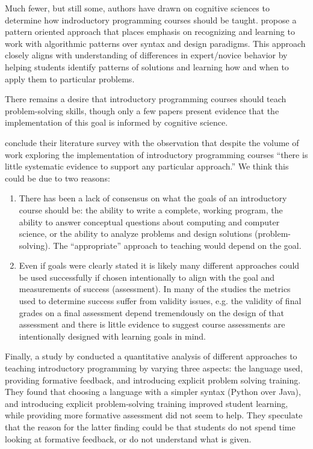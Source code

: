 \documentclass[12pt]{article}
\let\textcite=\autocite
\begin{document}
Much fewer, but still some, authors have drawn on cognitive sciences
to determine how indroductory programming courses should be
taught. \textcite{muller_pattern_2005} propose a pattern oriented
approach that places emphasis on recognizing and learning to work with
algorithmic patterns over syntax and design paradigms. This approach
closely aligns with understanding of differences in expert/novice
behavior by helping students identify patterns of solutions and
learning how and when to apply them to particular problems.

There remains a desire that introductory programming courses should
teach problem-solving skills, though only a few papers present
evidence that the implementation of this goal is informed by cognitive
science\autocite{kramarski_cognitivemetacognitive_1997,reed_incorporating_1998,muller_supporting_2008}.

\citeauthor{pears_survey_2007-1} conclude their
\citeyear{pears_survey_2007-1} literature survey with the observation
that despite the volume of work exploring the implementation of
introductory programming courses “there is little systematic evidence
to support any particular approach.”\autocite{pears_survey_2007-1}
We think this could be due to two reasons:

\begin{enumerate}
\item There has been a lack of consensus on what the goals of an
  introductory course should be: the ability to write a complete,
  working program, the ability to answer conceptual questions about
  computing and computer science, or the ability to analyze problems
  and design solutions (problem-solving). The “appropriate” approach
  to teaching would depend on the goal.

\item Even if goals were clearly stated it is likely many different
  approaches could be used successfully if chosen intentionally to
  align with the goal and measurements of success (assessment). In
  many of the studies the metrics used to determine success suffer
  from validity issues, e.g. the validity of final grades on a final
  assessment depend tremendously on the design of that assessment and
  there is little evidence to suggest course assessments are
  intentionally designed with learning goals in mind.
\end{enumerate}

Finally, a \citeyear{koulouri_teaching_2014} study by
\citeauthor{koulouri_teaching_2014} conducted a quantitative analysis
of different approaches to teaching introductory programming by
varying three aspects: the language used, providing formative
feedback, and introducing explicit problem solving
training\autocite{koulouri_teaching_2014}. They found that choosing a
language with a simpler syntax (Python over Java), and introducing
explicit problem-solving training improved student learning, while
providing more formative assessment did not seem to help. They
speculate that the reason for the latter finding could be that
students do not spend time looking at formative feedback, or do not
understand what is given.
\end{document}
